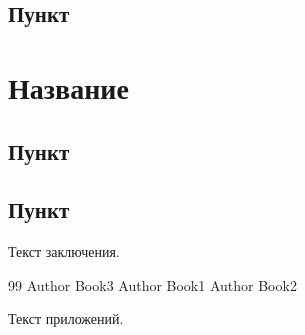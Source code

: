 \documentclass{timcw}
\begin{document}
\section{Пункт}

\newpage
\chapter[Глава \thechapter. Название]{Название}
\section{Пункт}
\section{Пункт}

\newpage
\conclusion

Текст заключения.

\newpage
\centeredrefname
\clearpage
{}
\begin{thebibliography}{99}
 Author Book3
 Author Book1
 Author Book2
\end{thebibliography}

\newpage
\applications

Текст приложений.
\end{document}
